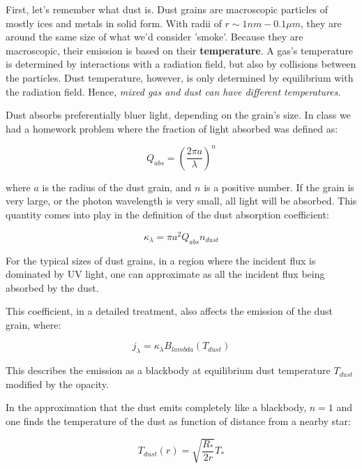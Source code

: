 	First, let's remember what dust is. Dust grains are macroscopic particles of mostly ices and metals in solid form. With radii of $r \sim 1 nm - 0.1 \mu m$, they are around the same size of what we'd consider 'smoke'. Because they are macroscopic, their emission is based on their \textbf{temperature}. A gas's temperature is determined by interactions with a radiation field, but also by collisions between the particles. Dust temperature, however, is only determined by equilibrium with the radiation field. Hence, \emph{mixed gas and dust can have different temperatures}. 
	
	Dust absorbs preferentially bluer light, depending on the grain's size. In class we had a homework problem where the fraction of light absorbed was defined as:
	
	\begin{equation}
	Q_{abs} = (\frac{2\pi a}{\lambda})^{n}
	\end{equation}
	
	where $a$ is the radius of the dust grain, and $n$ is a positive number. If the grain is very large, or the photon wavelength is very small, all light will be absorbed. This quantity comes into play in the definition of the dust absorption coefficient:
	
	\begin{equation}
	\kappa_{\lambda} = \pi a^{2} Q_{abs} n_{dust}
	\end{equation}
	
	For the typical sizes of dust grains, in a region where the incident flux is dominated by UV light, one can approximate as all the incident flux being absorbed by the dust. 
	
	This coefficient, in a detailed treatment, also affects the emission of the dust grain, where:
	
	\begin{equation}
	j_{\lambda} = \kappa_{\lambda} B_{lambda}(T_{dust})
	\end{equation}
	
	This describes the emission as a blackbody at equilibrium dust temperature $T_{dust}$ modified by the opacity. 
	
	In the approximation that the dust emits completely like a blackbody, $n = 1$ and one finds the temperature of the dust as function of distance from a nearby star:
	
	\begin{equation}
	T_{dust}(r) = \sqrt{\frac{R_{*}}{2r}}T_{*}
	\end{equation}	
	
